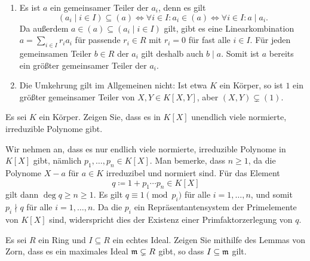 \begin{solution}
  \begin{enumerate}
    \item
      Es ist $a$ ein gemeinsamer Teiler der $a_i$, denn es gilt
      \[
              (a_i \mid i \in I) \subseteq (a)
        \iff  \forall i \in I: a_i \in (a)
        \iff  \forall i \in I: a \mid a_i.
      \]
      Da außerdem $a \in (a) \subseteq (a_i \mid i \in I)$ gilt, gibt es eine Linearkombination $a = \sum_{i \in I} r_i a_i$ für passende $r_i \in R$ mit $r_i = 0$ für fast alle $i \in I$.
      Für jeden gemeinsamen Teiler $b \in R$ der $a_i$ gilt deshalb auch $b \mid a$.
      Somit ist $a$ bereits ein größter gemeinsamer Teiler der $a_i$.
    \item
      Die Umkehrung gilt im Allgemeinen nicht:
      Ist etwa $K$ ein Körper, so ist $1$ ein größter gemeinsamer Teiler von $X, Y \in K[X, Y]$, aber $(X, Y) \subsetneq (1)$.
  \end{enumerate}
\end{solution}


\begin{question}[subtitle = Euklid]
  Es sei $K$ ein Körper.
  Zeigen Sie, dass es in $K[X]$ unendlich viele normierte, irreduzible Polynome gibt.
\end{question}


\begin{solution}
  Wir nehmen an, dass es nur endlich viele normierte, irreduzible Polynome in $K[X]$ gibt, nämlich $p_1, \dotsc, p_n \in K[X]$.
  Man bemerke, dass $n \geq 1$, da die Polynome $X - a$ für $a \in K$ irreduzibel und normiert sind.
  Für das Element
  \[
    q \coloneqq 1 + p_1 \dotsm p_n \in K[X]
  \]
  gilt dann $\deg q \geq n \geq 1$.
  Es gilt $q \equiv 1 \pmod{p_i}$ für alle $i = 1, \dotsc, n$, und somit $p_i \nmid q$ für alle $i = 1, \dotsc, n$.
  Da die $p_i$ ein Repräsentantensystem der Primelemente von $K[X]$ sind, widerspricht dies der Existenz einer Primfaktorzerlegung von $q$.
\end{solution}


\begin{question}[subtitle = Zur Existenz von maximalen Idealen]
  Es sei $R$ ein Ring und $I \subseteq R$ ein echtes Ideal.
  Zeigen Sie mithilfe des Lemmas von Zorn, dass es ein maximales Ideal $\mathfrak{m} \subsetneq R$ gibt, so dass $I \subseteq \mathfrak{m}$ gilt.
\end{question}


